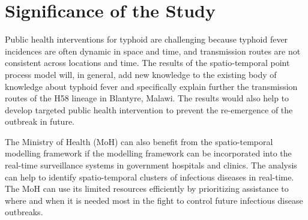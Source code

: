 \section{Significance of the Study}

Public health interventions for typhoid are challenging because typhoid fever incidences are often dynamic in space and time, and transmission routes are not consistent across locations and time. The results of the spatio-temporal point process model will, in general, add new knowledge to the existing body of knowledge about typhoid fever and specifically explain further the transmission routes of the H58 lineage in Blantyre, Malawi. The results would also help to develop targeted public health intervention to prevent the re-emergence of the outbreak in future.

The Ministry of Health (MoH) can also benefit from the spatio-temporal modelling framework if the modelling framework can be incorporated into the real-time surveillance systems in government hospitals and clinics. The analysis can help to identify spatio-temporal clusters of infectious diseases in real-time. The MoH can use its limited resources efficiently by prioritizing assistance to where and when it is needed most in the fight to control future infectious disease outbreaks.
